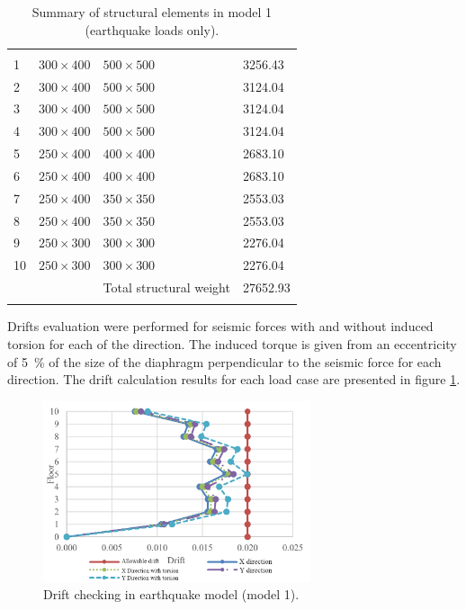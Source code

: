 \documentclass{cup-pan}
\begin{document}
\renewcommand{\arraystretch}{1}
\begin{longtable}{P{0.75in} P{1.25in} P{1.25in} P{1.25in}}
\caption{Summary of structural elements in model 1 (earthquake loads only).}\\
\headrow {} &  &  &  \\
1 & $300 \times 400$ & $500 \times 500$ & \num{3256.43}  \\
2 & $300 \times 400$ & $500 \times 500$ & \num{3124.04}  \\
3 & $300 \times 400$ & $500 \times 500$ & \num{3124.04}  \\
4 & $300 \times 400$ & $500 \times 500$ & \num{3124.04}  \\
5 & $250 \times 400$ & $400 \times 400$ & \num{2683.10}  \\
6 & $250 \times 400$ & $400 \times 400$ & \num{2683.10}  \\
7 & $250 \times 400$ & $350 \times 350$ & \num{2553.03}  \\
8 & $250 \times 400$ & $350 \times 350$ & \num{2553.03}  \\
9 & $250 \times 300$ & $300 \times 300$ & \num{2276.04}  \\
10 & $250 \times 300$ & $300 \times 300$ & \num{2276.04}  \\
 &  & Total structural weight & \num{27652.93}  \\
\label{tab:cross section model 1}
\end{longtable}

Drifts evaluation were performed for seismic forces with and without induced torsion for each of the direction. The induced torque is given from an eccentricity of \SI{5}{\percent} of the size of the diaphragm perpendicular to the seismic force for each direction. The drift calculation results for each load case are presented in figure \ref{fig:driftchecking}.

\begin{figure}[H]
\centering
\includegraphics[width=0.7\textwidth]{Picture8_engels.png}
\caption{Drift checking in earthquake model (model 1).}
\label{fig:driftchecking}
\end{figure}
\end{document}
